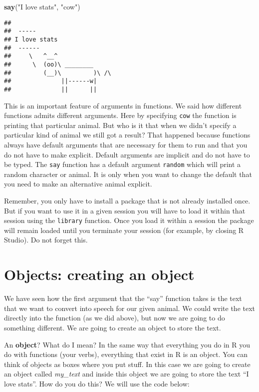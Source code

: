 \documentclass[
]{book}
\newenvironment{Shaded}{\begin{snugshade}}{\end{snugshade}}
\newcommand{\FunctionTok}[1]{\textcolor[rgb]{0.13,0.29,0.53}{\textbf{#1}}}
\newcommand{\NormalTok}[1]{#1}
\newcommand{\StringTok}[1]{\textcolor[rgb]{0.31,0.60,0.02}{#1}}
\begin{document}
\begin{Shaded}
\begin{Highlighting}[]
\FunctionTok{say}\NormalTok{(}\StringTok{"I love stats"}\NormalTok{, }\StringTok{"cow"}\NormalTok{)}
\end{Highlighting}
\end{Shaded}

\begin{verbatim}
## 
##  ----- 
## I love stats 
##  ------ 
##     \   ^__^ 
##      \  (oo)\ ________ 
##         (__)\         )\ /\ 
##              ||------w|
##              ||      ||
\end{verbatim}

This is an important feature of arguments in functions. We said how different functions admits different arguments. Here by specifying \texttt{cow} the function is printing that particular animal. But who is it that when we didn't specify a particular kind of animal we still got a result? That happened because functions always have default arguments that are necessary for them to run and that you do not have to make explicit. Default arguments are implicit and do not have to be typed. The \texttt{say} function has a default argument \texttt{random} which will print a random character or animal. It is only when you want to change the default that you need to make an alternative animal explicit.

Remember, you only have to install a package that is not already installed once. But if you want to use it in a given session you will have to load it within that session using the \texttt{library} function. Once you load it within a session the package will remain loaded until you terminate your session (for example, by closing R Studio). Do not forget this.

\section{Objects: creating an object}\label{objects-creating-an-object}

We have seen how the first argument that the ``say'' function takes is the text that we want to convert into speech for our given animal. We could write the text directly into the function (as we did above), but now we are going to do something different. We are going to create an object to store the text.

An \textbf{object}? What do I mean? In the same way that everything you do in R you do with functions (your verbs), everything that exist in R is an object. You can think of objects as boxes where you put stuff. In this case we are going to create an object called \emph{my\_text} and inside this object we are going to store the text ``I love stats''. How do you do this? We will use the code below:
\end{document}
